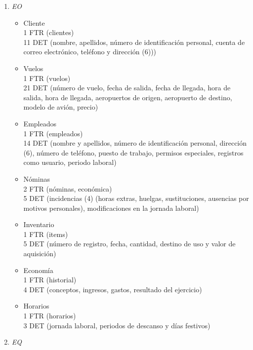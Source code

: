 \begin{enumerate}
	\item \textit{EO}

		\begin{itemize}
			\item Cliente \\
			{1 FTR (clientes)}\\
			{11 DET (nombre, apellidos, número de identificación personal, cuenta de correo electrónico, teléfono y dirección (6)))}\\
			\item Vuelos \\
			{1 FTR (vuelos)}\\
			{21 DET (número de vuelo, fecha de salida, fecha de llegada, hora de salida, hora de llegada, aeropuertos de origen,
			aeropuerto de destino, modelo de avión, precio)}\\
			\item Empleados \\
			{1 FTR (empleados)}\\
			{14 DET (nombre y apellidos, número de identificación personal, dirección (6), número de teléfono, puesto de trabajo,
			permisos especiales, registros como usuario, periodo laboral)}\\
			\item Nóminas \\
			{2 FTR (nóminas, económica)}\\
			{5 DET (incidencias (4) (horas extras, huelgas, sustituciones, ausencias por motivos personales), modificaciones en la
			jornada laboral)}\\
			\item Inventario \\
			{1 FTR (items)}\\
			{5 DET (número de registro, fecha, cantidad, destino de uso y valor de aquisición)}\\
			\item Economía \\
			{1 FTR (historial)}\\
			{4 DET (conceptos, ingresos, gastos, resultado del ejercicio)}\\
			\item Horarios \\
			{1 FTR (horarios)}\\
			{3 DET (jornada laboral, periodos de descanso y días festivos)}\\
		\end{itemize}

	\item \textit{EQ}


\end{enumerate}
